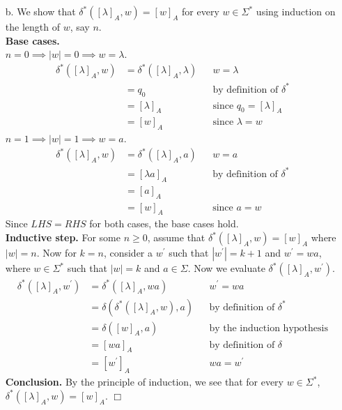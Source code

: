 \documentclass [10pt]{article}
\begin{document}
\begin{enumerate}
\begin{enumerate}
		\item[b.]We show that $\delta^{*}([\lambda]_{A},w)=[w]_{A}$ for every $w\in\Sigma^{*}$ using induction on the length of $w$, say $n$.\\
		\textbf{Base cases.}\\
		$n=0\implies\left|w\right|=0\implies w=\lambda$.
		\begin{align}
			\delta^{*}([\lambda]_{A},w) &= \delta^{*}([\lambda]_{A},\lambda) && \text{$w=\lambda$} \nonumber \\
			&= q_{0} && \text{by definition of $\delta^{*}$} \nonumber \\
			&= [\lambda]_{A} && \text{since $q_{0}=[\lambda]_{A}$} \nonumber \\
			&= [w]_{A} && \text{since $\lambda=w$} \nonumber
		\end{align}
		$n=1\implies\left|w\right|=1\implies w=a$.
		\begin{align}
			\delta^{*}([\lambda]_{A},w) &= \delta^{*}([\lambda]_{A},a) && \text{$w=a$} \nonumber \\
			&= [\lambda a]_{A} && \text{by definition of $\delta^{*}$} \nonumber \\
			&= [a]_{A} \nonumber \\
			&= [w]_{A} && \text{since $a=w$} \nonumber
		\end{align}
		Since $LHS = RHS$ for both cases, the base cases hold.\\
		\textbf{Inductive step.} For some $n\ge0$, assume that $\delta^{*}([\lambda]_{A},w)=[w]_{A}$ where $\left|w\right|=n$. Now for $k=n$, consider a $w^{\prime}$ such that $\left|w^{\prime}\right|=k+1$ and $w^{\prime}=wa$, where $w\in\Sigma^{*}$ such that $\left|w\right|=k$ and $a\in\Sigma$. Now we evaluate $\delta^{*}([\lambda]_{A},w^{\prime})$.
		\begin{align}
			\delta^{*}([\lambda]_{A},w^{\prime}) &= \delta^{*}([\lambda]_{A},wa) && \text{$w^{\prime}=wa$} \nonumber \\
			&= \delta(\delta^{*}([\lambda]_{A},w),a) && \text{by definition of $\delta^{*}$} \nonumber \\
			&= \delta([w]_{A},a) && \text{by the induction hypothesis} \nonumber \\
			&= [wa]_{A} && \text{by definition of $\delta$} \nonumber \\
			&= [w^{\prime}]_{A} && \text{$wa=w^{\prime}$} \nonumber
		\end{align}
		\textbf{Conclusion.} By the principle of induction, we see that for every $w\in\Sigma^{*}$, $\delta^{*}([\lambda]_{A},w)=[w]_{A}$. $\Box$

\end{enumerate}
\end{enumerate}
\end{document}
